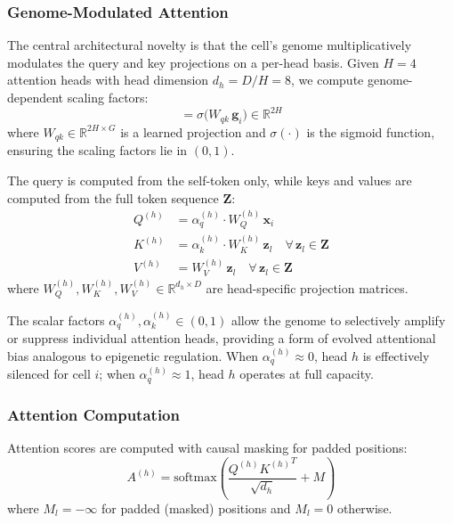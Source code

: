 \documentclass[10pt,twocolumn]{article}
\begin{document}
\subsubsection{Genome-Modulated Attention}

The central architectural novelty is that the cell's genome multiplicatively modulates the query and key projections on a per-head basis.
Given $H = 4$ attention heads with head dimension $d_h = D/H = 8$, we compute genome-dependent scaling factors:
\begin{equation}
  [\bm{\alpha}_q,\; \bm{\alpha}_k] = \sigma\!\big(W_{qk}\, \mathbf{g}_i\big) \in \mathbb{R}^{2H}
  \label{eq:genome_scale}
\end{equation}
where $W_{qk} \in \mathbb{R}^{2H \times G}$ is a learned projection and $\sigma(\cdot)$ is the sigmoid function, ensuring the scaling factors lie in $(0, 1)$.

The query is computed from the self-token only, while keys and values are computed from the full token sequence $\mathbf{Z}$:
\begin{align}
  Q^{(h)} &= \alpha_q^{(h)} \cdot W_Q^{(h)}\, \mathbf{x}_i \label{eq:query} \\
  K^{(h)} &= \alpha_k^{(h)} \cdot W_K^{(h)}\, \mathbf{z}_l \quad \forall\, \mathbf{z}_l \in \mathbf{Z} \label{eq:key} \\
  V^{(h)} &= W_V^{(h)}\, \mathbf{z}_l \quad \forall\, \mathbf{z}_l \in \mathbf{Z} \label{eq:value}
\end{align}
where $W_Q^{(h)}, W_K^{(h)}, W_V^{(h)} \in \mathbb{R}^{d_h \times D}$ are head-specific projection matrices.

The scalar factors $\alpha_q^{(h)}, \alpha_k^{(h)} \in (0,1)$ allow the genome to selectively amplify or suppress individual attention heads, providing a form of evolved attentional bias analogous to epigenetic regulation.
When $\alpha_q^{(h)} \approx 0$, head $h$ is effectively silenced for cell $i$; when $\alpha_q^{(h)} \approx 1$, head $h$ operates at full capacity.

\subsubsection{Attention Computation}

Attention scores are computed with causal masking for padded positions:
\begin{equation}
  A^{(h)} = \text{softmax}\!\left(\frac{Q^{(h)} {K^{(h)}}^T}{\sqrt{d_h}} + M\right)
  \label{eq:attention}
\end{equation}
where $M_l = -\infty$ for padded (masked) positions and $M_l = 0$ otherwise.
\end{document}
